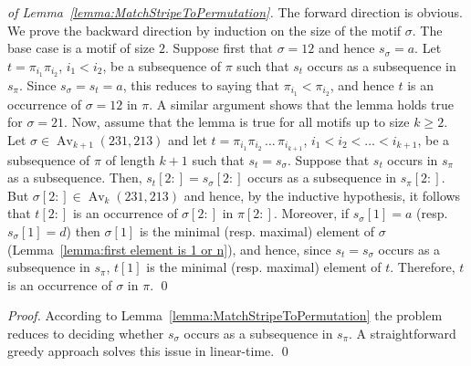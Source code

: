 \documentclass[a4paper]{llncs}
\DeclareMathOperator{\AV}{Av}
\DeclareMathOperator{\Avd}{Av}
\newcommand\Av[2]{\Avd_{{#1}}({#2})}
\begin{document}
\begin{proof}[of Lemma~\ref{lemma:MatchStripeToPermutation}]
  The forward direction is obvious.
  We prove the backward direction by induction on the size of the motif
  $\sigma$.
  The base case is a motif of size $2$.
  Suppose first that $\sigma = 12$ and hence $s_\sigma = a$.
  Let $t = \pi_{i_1}\pi_{i_2}$, $i_1 < i_2$, be a subsequence of $\pi$
  such that $s_t$ occurs as a subsequence in $s_\pi$.
  Since $s_\sigma = s_t = a$, this reduces to saying that
  $\pi_{i_1} < \pi_{i_2}$, and hence $t$ is an occurrence of $\sigma = 12$ in $\pi$.
  A similar argument shows that the lemma holds true for $\sigma = 21$.
  Now, assume that the lemma is true for all motifs up to size $k \geq 2$.
  Let $\sigma \in \Av{k+1}{231,213}$ and
  let $t = \pi_{i_1}\pi_{i_2}\,\ldots\,\pi_{i_{k+1}}$,
  $i_1 < i_2 < \ldots < i_{k+1}$,
  be a subsequence of $\pi$ of length $k+1$ such that
  $s_t = s_\sigma$.
  Suppose that $s_t$ occurs in $s_\pi$ as a subsequence.
  Then, $s_t[2:] = s_\sigma[2:]$ occurs as a subsequence in $s_\pi[2:]$.
  But $\sigma[2:] \in \Av{k}{231,213}$ and hence,
  by the inductive hypothesis, it follows that
  $t[2:]$ is an occurrence of $\sigma[2:]$ in $\pi[2:]$.
  Moreover, if $s_\sigma[1] = a$ (resp. $s_\sigma[1] = d$)
  then $\sigma[1]$ is the minimal (resp. maximal) element of $\sigma$
  (Lemma~\ref{lemma:first element is 1 or n}),
  and hence, since $s_t = s_\sigma$ occurs as a subsequence in $s_\pi$,
  $t[1]$ is the minimal (resp. maximal) element of $t$.
  Therefore, $t$ is an occurrence of $\sigma$ in $\pi$.
  \qed
\end{proof}

\bigskip

\begin{proof}
According to Lemma~\ref{lemma:MatchStripeToPermutation} the problem reduces
to deciding whether $s_\sigma$ occurs as a subsequence in $s_\pi$.
A straightforward greedy approach solves this issue in linear-time.
\qed
\end{proof}

\bigskip
\end{document}
